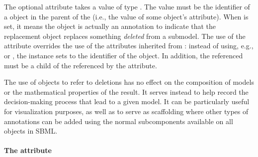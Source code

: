 The optional attribute  takes a value of type
.  The value must be the identifier of a \Deletion
object in the parent \Model of the \ReplacedElement (i.e., the value of
some \Deletion object's  attribute).  When  is
set, it means the \ReplacedElement object is actually an annotation to
indicate that the replacement object replaces something \emph{deleted}
from a submodel.  The use of the  attribute overrides
the use of the attributes inherited from \SBaseRef: instead of using,
e.g.,  or , the \ReplacedElement instance
sets  to the identifier of the \Deletion object.  In
addition, the referenced \Deletion must be a child of the \Submodel
referenced by the  attribute.

The use of \ReplacedElement objects to refer to deletions has no effect
on the composition of models or the mathematical properties of the
result.  It serves instead to help record the decision-making process
that lead to a given model.  It can be particularly useful for
visualization purposes, as well as to serve as scaffolding where other
types of annotations can be added using the normal \Annotation
subcomponents available on all \SBase objects in SBML.

%


\paragraph{The \fixttspace{} attribute}
\label{replacedelement-conversionfactor}

